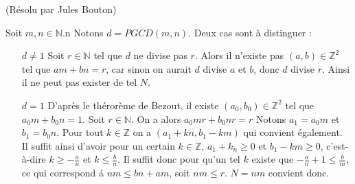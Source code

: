 \begin{sol}[24](Résolu par Jules Bouton)

Soit $m,n \in \mathbb{N}$.n Notons $d= PGCD(m,n)$.
Deux cas sont \`a distinguer :
\begin{itemize}
	\item[$d \not =1$]
		Soit $r \in \mathbb{N}$ tel que $d$ ne divise pas $r$. Alors il n'existe pas $(a,b) \in \mathbb{Z}^2$ tel que $am+bn=r$, car sinon on aurait $d$ divise $a$ et $b$,
		donc $d$ divise $r$.
		Ainsi il ne peut pas exister de tel $N$.

	\item[$d=1$]
		D'apr\`es le th\'eror\`eme de Bezout, il existe $(a_0,b_0) \in \mathbb{Z}^2$ tel que $a_0m+b_0n=1$.
		Soit $r\in \mathbb{N}$. On a alors $a_0mr+b_0nr=r$
		Notons $a_1=a_0m$ et $b_1=b_0n$.
		Pour tout $k \in \mathbb{Z}$ on a $(a_1+kn, b_1-km)$ qui convient \'egalement. 
		Il suffit ainsi d'avoir pour un certain $k \in \mathbb{Z}$, $a_1+k_n \geq 0$ et $b_1-km \geq 0$, c'est-\`a-dire
		$k\geq -\frac{a}{n}$ et $k \leq \frac{b}{n}$.
		Il suffit donc pour qu'un tel $k$ existe que $-\frac{a}{n}+1 \leq \frac{b}{m}$,
		ce qui correspond \'a $nm \leq bn+am$, soit $nm \leq r$.
		$N=nm$ convient donc.
		
	

\end{itemize}



\end{sol}

